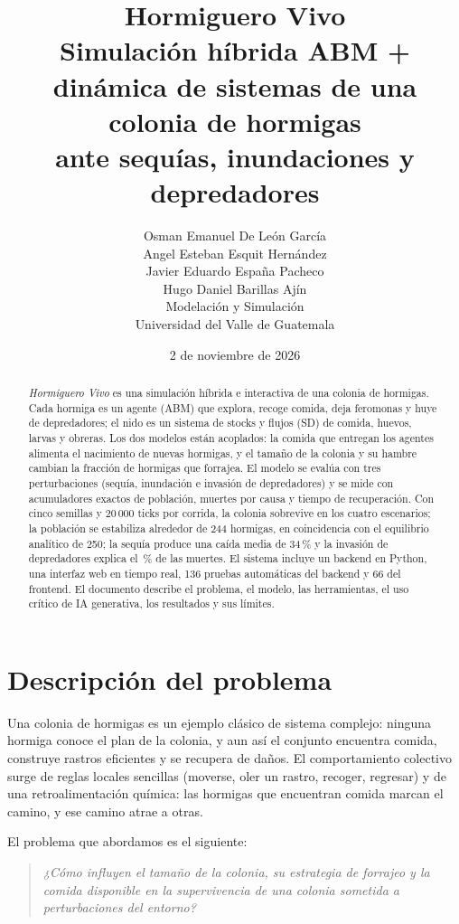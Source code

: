 \documentclass[11pt,a4paper]{article}
\title{\textbf{Hormiguero Vivo}\\[2pt]
\large Simulación híbrida ABM + dinámica de sistemas de una colonia de hormigas\\
ante sequías, inundaciones y depredadores}
\author{Osman Emanuel De León García\\
Angel Esteban Esquit Hernández\\
Javier Eduardo España Pacheco\\
Hugo Daniel Barillas Ajín\\[4pt]
Modelación y Simulación\\ Universidad del Valle de Guatemala}
\date{2 de noviembre de 2026}
\begin{document}
\maketitle

\begin{abstract}
\noindent
\textit{Hormiguero Vivo} es una simulación híbrida e interactiva de una colonia de hormigas. Cada hormiga es un agente (ABM) que explora, recoge comida, deja feromonas y huye de depredadores; el nido es un sistema de stocks y flujos (SD) de comida, huevos, larvas y obreras. Los dos modelos están acoplados: la comida que entregan los agentes alimenta el nacimiento de nuevas hormigas, y el tamaño de la colonia y su hambre cambian la fracción de hormigas que forrajea. El modelo se evalúa con tres perturbaciones (sequía, inundación e invasión de depredadores) y se mide con acumuladores exactos de población, muertes por causa y tiempo de recuperación. Con cinco semillas y 20\,000 ticks por corrida, la colonia sobrevive en los cuatro escenarios; la población se estabiliza alrededor de 244 hormigas, en coincidencia con el equilibrio analítico de 250; la sequía produce una caída media de 34\,\% y la invasión de depredadores explica el \comparteinvasion\,\% de las muertes. El sistema incluye un backend en Python, una interfaz web en tiempo real, 136 pruebas automáticas del backend y 66 del frontend. El documento describe el problema, el modelo, las herramientas, el uso crítico de IA generativa, los resultados y sus límites.
\end{abstract}

\tableofcontents
\newpage

\section{Descripción del problema}

Una colonia de hormigas es un ejemplo clásico de sistema complejo: ninguna hormiga conoce el plan de la colonia, y aun así el conjunto encuentra comida, construye rastros eficientes y se recupera de daños. El comportamiento colectivo surge de reglas locales sencillas (moverse, oler un rastro, recoger, regresar) y de una retroalimentación química: las hormigas que encuentran comida marcan el camino, y ese camino atrae a otras.

El problema que abordamos es el siguiente:

\begin{quote}
\textit{¿Cómo influyen el tamaño de la colonia, su estrategia de forrajeo y la comida disponible en la supervivencia de una colonia sometida a perturbaciones del entorno?}
\end{quote}
\end{document}
